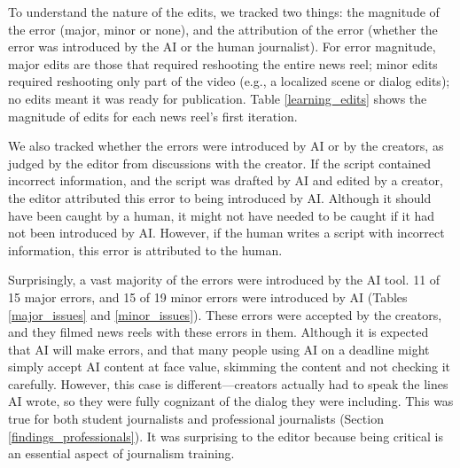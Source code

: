 To understand the nature of the edits, we tracked two things: the magnitude of the error (major, minor or none), and the attribution of the error (whether the error was introduced by the AI or the human journalist). 
For error magnitude, major edits are those that required reshooting the entire news reel; minor edits required reshooting only part of the video (e.g., a localized scene or dialog edits); no edits meant it was ready for publication.
Table \ref{learning_edits} shows the magnitude of edits for each news reel's first iteration.

We also tracked whether the errors were introduced by AI or by the creators, as judged by the editor from discussions with the creator.
If the script contained incorrect information, and the script was drafted by AI and edited by a creator, the editor attributed this error to being introduced by AI. 
Although it should have been caught by a human, it might not have needed to be caught if it had not been introduced by AI. 
However, if the human writes a script with incorrect information, this error is attributed to the human.


Surprisingly, a vast majority of the errors were introduced by the AI tool. 
11 of 15 major errors, and 15 of 19 minor errors were introduced by AI (Tables \ref{major_issues} and \ref{minor_issues}).
These errors were accepted by the creators, and they filmed news reels with these errors in them. 
Although it is expected that AI will make errors, and that many people using AI on a deadline might simply accept AI content at face value, skimming the content and not checking it carefully. 
However, this case is different---creators actually had to speak the lines AI wrote, so they were fully cognizant of the dialog they were including. 
This was true for both student journalists and professional journalists (Section \ref{findings_professionals}).
It was surprising to the editor because being critical is an essential aspect of journalism training.  

